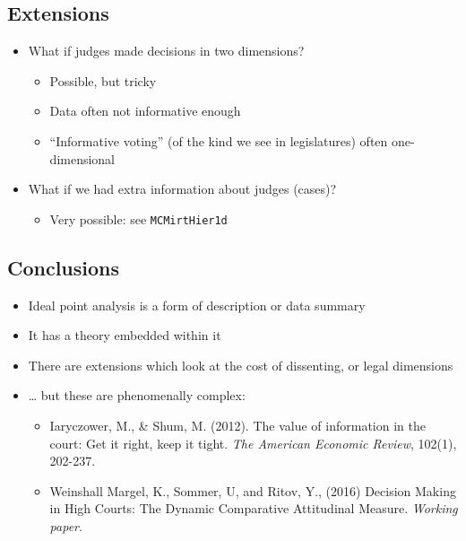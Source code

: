 \documentclass[12pt,twoside]{article}
\providecommand{\tightlist}{%
  \setlength{\itemsep}{0pt}\setlength{\parskip}{0pt}}
\begin{document}
\subsection{Extensions}\label{extensions}

\begin{itemize}
\tightlist
\item
  What if judges made decisions in two dimensions?

  \begin{itemize}
  \tightlist
  \item
    Possible, but tricky
  \item
    Data often not informative enough
  \item
    ``Informative voting'' (of the kind we see in legislatures) often
    one-dimensional
  \end{itemize}
\item
  What if we had extra information about judges (cases)?

  \begin{itemize}
  \tightlist
  \item
    Very possible: see \texttt{MCMirtHier1d}
  \end{itemize}
\end{itemize}

\subsection{Conclusions}\label{conclusions}

\begin{itemize}
\tightlist
\item
  Ideal point analysis is a form of description or data summary
\item
  It has a theory embedded within it
\item
  There are extensions which look at the cost of dissenting, or legal
  dimensions
\item
  \ldots{} but these are phenomenally complex:

  \begin{itemize}
  \tightlist
  \item
    Iaryczower, M., \& Shum, M. (2012). The value of information in the
    court: Get it right, keep it tight. \emph{The American Economic
    Review}, 102(1), 202-237.
  \item
    Weinshall Margel, K., Sommer, U, and Ritov, Y., (2016) Decision
    Making in High Courts: The Dynamic Comparative Attitudinal Measure.
    \emph{Working paper}.
  \end{itemize}
\end{itemize}

\hypertarget{refs}{}
\end{document}
